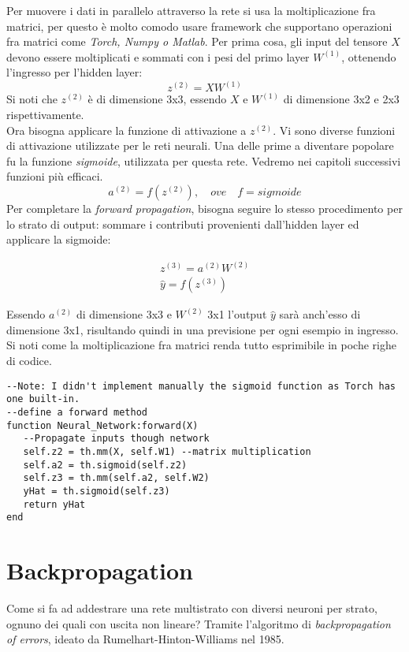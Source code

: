 Per muovere i dati in parallelo attraverso la rete si usa la moltiplicazione fra matrici, per questo è molto comodo usare framework che supportano operazioni fra matrici come \emph{Torch, Numpy o Matlab}. Per prima cosa, gli input del tensore $X$ devono essere moltiplicati e sommati con i pesi del primo layer $W^{(1)}$, ottenendo l'ingresso per l'hidden layer:
\begin{equation}
z^{(2)} = XW^{(1)} \tag{1}
\end{equation}
Si noti che $z^{(2)}$ è di dimensione 3x3, essendo $X$ e $W^{(1)}$ di dimensione 3x2 e 2x3 rispettivamente. \\
Ora bisogna applicare la funzione di attivazione a $z^{(2)}$. Vi sono diverse funzioni di attivazione utilizzate per le reti neurali. Una delle prime a diventare popolare fu la funzione \emph{sigmoide}\parencite{WSigmoid}, utilizzata per questa rete. Vedremo nei capitoli successivi funzioni più efficaci.
\begin{equation}
a^{(2)} = f(z^{(2)}) \tag{2},\quad ove \quad f=sigmoide
\end{equation}
Per completare la \emph{forward propagation}, bisogna seguire lo stesso procedimento per lo strato di output: sommare i contributi provenienti dall'hidden layer ed applicare la sigmoide:
\begin{center}
\begin{align*}
z^{(3)} = a^{(2)}W^{(2)} \tag{3}\\
\hat{y} = f(z^{(3)}) \tag{4}
\end{align*}
\end{center}
Essendo $a^{(2)}$ di dimensione 3x3 e $W^{(2)}$ 3x1 l'output $\hat{y}$ sarà anch'esso di dimensione 3x1, risultando quindi in una previsione per ogni esempio in ingresso. \\
Si noti come la moltiplicazione fra matrici renda tutto esprimibile in poche righe di codice.
\begin{lstlisting}[language={[5.2]Lua}]
--Note: I didn't implement manually the sigmoid function as Torch has one built-in.
--define a forward method
function Neural_Network:forward(X)
   --Propagate inputs though network
   self.z2 = th.mm(X, self.W1) --matrix multiplication
   self.a2 = th.sigmoid(self.z2)
   self.z3 = th.mm(self.a2, self.W2)
   yHat = th.sigmoid(self.z3)
   return yHat
end
\end{lstlisting}
\section{Backpropagation}
\label{sec:backprop}
Come si fa ad addestrare una rete multistrato con diversi neuroni per strato, ognuno dei quali con uscita non lineare? Tramite l'algoritmo di \emph{backpropagation of errors}, ideato da Rumelhart-Hinton-Williams nel 1985.

